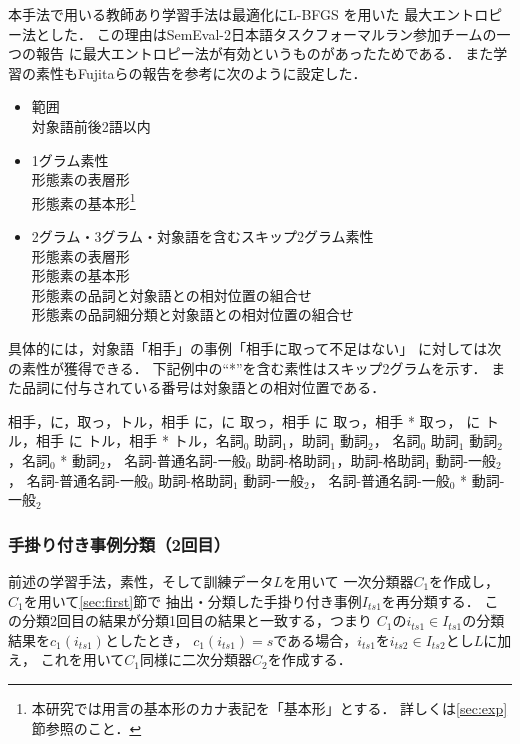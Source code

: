 \documentclass[japanese]{jnlp_1.4}
\begin{document}
本手法で用いる教師あり学習手法は最適化にL-BFGS \cite{Liu89}を用いた
最大エントロピー法\cite{Nigam00a}とした．
この理由はSemEval-2日本語タスクフォーマルラン参加チームの一つの報告
\cite{Fujita10}に最大エントロピー法が有効というものがあったためである．
また学習の素性もFujitaらの報告を参考に次のように設定した．

\begin{itemize}
\item 範囲\\対象語前後2語以内
\item 1グラム素性\\
形態素の表層形\\
形態素の基本形\footnote{本研究では用言の基本形のカナ表記を「基本形」とする．
詳しくは\ref{sec:exp}節参照のこと．}
\item 2グラム・3グラム・対象語を含むスキップ2グラム素性\\
形態素の表層形\\
形態素の基本形\\
形態素の品詞と対象語との相対位置の組合せ\\
形態素の品詞細分類と対象語との相対位置の組合せ
\end{itemize}

具体的には，対象語「相手」の事例「相手に取って不足はない」
に対しては次の素性が獲得できる．
下記例中の``*''を含む素性はスキップ2グラムを示す．
また品詞に付与されている番号は対象語との相対位置である．

\vspace{0.5\baselineskip}
\begin{center}
\begin{minipage}{0.85\hsize}
\small
相手，に，取っ，トル，相手 に，に 取っ，相手 に 取っ，相手 * 取っ，
に トル，相手 に トル，相手 * トル，名詞$_0$ 助詞$_1$，助詞$_1$ 動詞$_2$，
名詞$_0$ 助詞$_1$ 動詞$_2$，名詞$_0$ * 動詞$_2$，
名詞-普通名詞-一般$_0$ 助詞-格助詞$_1$，助詞-格助詞$_1$ 動詞-一般$_2$，
名詞-普通名詞-一般$_0$ 助詞-格助詞$_1$ 動詞-一般$_2$，
名詞-普通名詞-一般$_0$ * 動詞-一般$_2$
\end{minipage}
\end{center}
\vspace{0.5\baselineskip}


\subsubsection{手掛り付き事例分類（2回目）}

前述の学習手法，素性，そして訓練データ$L$を用いて
一次分類器$C_1$を作成し，$C_1$を用いて\ref{sec:first}節で
抽出・分類した手掛り付き事例$I_{ts1}$を再分類する．
この分類2回目の結果が分類1回目の結果と一致する，つまり
$C_1$の$i_{ts1} \in I_{ts1}$の分類結果を$c_1(i_{ts1})$としたとき，
$c_1(i_{ts1})=s$である場合，$i_{ts1}$を$i_{ts2} \in I_{ts2}$とし$L$に加え，
これを用いて$C_1$同様に二次分類器$C_2$を作成する．
\end{document}
